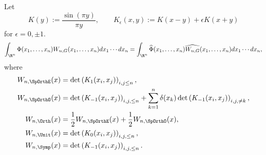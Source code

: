 Let
	\[ K(y) := \frac{\sin (\pi y)}{\pi y}, \qquad K_\epsilon (x, y) := K(x - y) + \epsilon K(x + y) \]
for $\epsilon = 0, \pm 1$. 
	\[ \int_{\R^n} \Phi(x_1, \dots, x_n) W_{n, G} (x_1, \dots, x_n) dx_1 \cdots dx_n = \int_{\R^n} \widehat{\Phi} (x_1, \dots, x_n) \widehat{W_{n, G}} (x_1, \dots, x_n) dx_1 \cdots dx_n, \]	
where 
	\begin{align}
		W_{n, \SpOrthE} (x) 	
			&= \det \left( K_1 (x_i, x_j) \right)_{i, j \leq n}, \\
		W_{n, \SpOrthO} (x)
			&= \det \left( K_{-1} (x_i, x_j) \right)_{i, j, \leq n} + \sum_{k = 1}^n \delta (x_k) \det \left( K_{-1} (x_i, x_j) \right)_{i, j, \neq k},  \\
		W_{n, \Orth} (x)
			&= \frac12 W_{n, \SpOrthE} (x) + \frac12 W_{n, \SpOrthO} (x), \\
		W_{n, \Unit} (x)
			&= \det \left( K_0 (x_i, x_j) \right)_{i, j, \leq n}, \\
		W_{n, \Symp} (x)			
			&=\det \left( K_{-1} (x_i, x_j) \right)_{i, j, \leq n}. \\
	\end{align}
